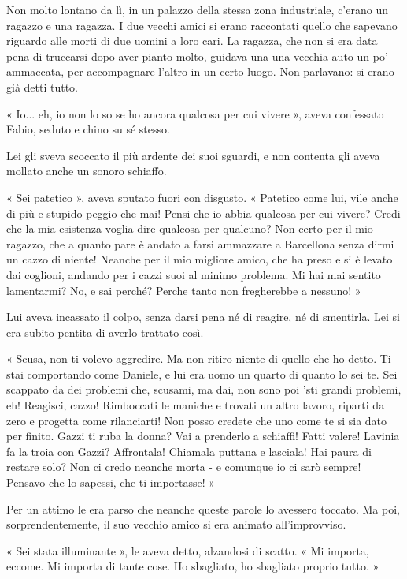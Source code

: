 Non molto lontano da lì, in un palazzo della stessa zona industriale, c'erano un ragazzo e una ragazza. I due vecchi amici si erano raccontati quello che sapevano riguardo alle morti di due uomini a loro cari. La ragazza, che non si era data pena di truccarsi dopo aver pianto molto, guidava una una vecchia auto un po' ammaccata, per accompagnare l'altro in un certo luogo. Non parlavano: si erano già detti tutto.

« Io... eh, io non lo so se ho ancora qualcosa per cui vivere », aveva confessato Fabio, seduto e chino su sé stesso.

Lei gli sveva scoccato il più ardente dei suoi sguardi, e non contenta gli aveva mollato anche un sonoro schiaffo.

« Sei patetico », aveva sputato fuori con disgusto. « Patetico come lui, vile anche di più e stupido peggio che mai! Pensi che io abbia qualcosa per cui vivere? Credi che la mia esistenza voglia dire qualcosa per qualcuno? Non certo per il mio ragazzo, che a quanto pare è andato a farsi ammazzare a Barcellona senza dirmi un cazzo di niente! Neanche per il mio migliore amico, che ha preso e si è levato dai coglioni, andando per i cazzi suoi al minimo problema. Mi hai mai sentito lamentarmi? No, e sai perché? Perche tanto non fregherebbe a nessuno! »

Lui aveva incassato il colpo, senza darsi pena né di reagire, né di smentirla. Lei si era subito pentita di averlo trattato così.

« Scusa, non ti volevo aggredire. Ma non ritiro niente di quello che ho detto. Ti stai comportando come Daniele, e lui era uomo un quarto di quanto lo sei te. Sei scappato da dei problemi che, scusami, ma dai, non sono poi 'sti grandi problemi, eh! Reagisci, cazzo! Rimboccati le maniche e trovati un altro lavoro, riparti da zero e progetta come rilanciarti! Non posso credete che uno come te si sia dato per finito. Gazzi ti ruba la donna? Vai a prenderlo a schiaffi! Fatti valere! Lavinia fa la troia con Gazzi? Affrontala! Chiamala puttana e lasciala! Hai paura di restare solo? Non ci credo neanche morta - e comunque io ci sarò sempre! Pensavo che lo sapessi, che ti importasse! »

Per un attimo le era parso che neanche queste parole lo avessero toccato. Ma poi, sorprendentemente, il suo vecchio amico si era animato all'improvviso.

« Sei stata illuminante », le aveva detto, alzandosi di scatto. « Mi importa, eccome. Mi importa di tante cose. Ho sbagliato, ho sbagliato proprio tutto. »

